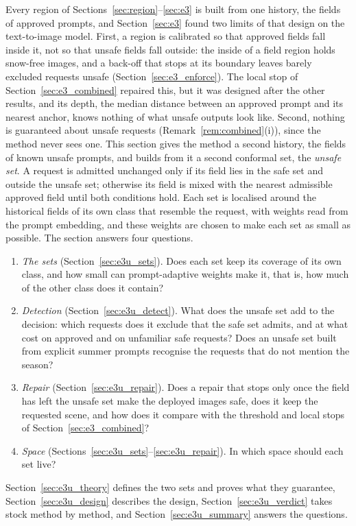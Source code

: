 \documentclass{article}
\theoremstyle{plain}
\theoremstyle{remark}
\begin{document}
Every region of Sections~\ref{sec:region}--\ref{sec:e3} is built from one history, the fields of approved prompts, and
Section~\ref{sec:e3} found two limits of that design on the text-to-image model. First, a region is calibrated so that approved fields
fall inside it, not so that unsafe fields fall outside: the inside of a field region holds snow-free images, and a back-off that stops
at its boundary leaves barely excluded requests unsafe (Section~\ref{sec:e3_enforce}). The local stop of Section~\ref{sec:e3_combined}
repaired this, but it was designed after the other results, and its depth, the median distance between an approved prompt and its
nearest anchor, knows nothing of what unsafe outputs look like. Second, nothing is guaranteed about unsafe requests
(Remark~\ref{rem:combined}(i)), since the method never sees one. This section gives the method a second history, the fields of known
unsafe prompts, and builds from it a second conformal set, the \emph{unsafe set}. A request is admitted unchanged only if its field
lies in the safe set and outside the unsafe set; otherwise its field is mixed with the nearest admissible approved field until both
conditions hold. Each set is localised around the historical fields of its own class that resemble the request, with weights read
from the prompt embedding, and these weights are chosen to make each set as small as possible. The section answers four questions.
\begin{enumerate}[label=(Q\arabic*)]
\item \emph{The sets} (Section~\ref{sec:e3u_sets}). Does each set keep its coverage of its own class, and how small can prompt-adaptive
weights make it, that is, how much of the other class does it contain?
\item \emph{Detection} (Section~\ref{sec:e3u_detect}). What does the unsafe set add to the decision: which requests does it exclude that
the safe set admits, and at what cost on approved and on unfamiliar safe requests? Does an unsafe set built from explicit summer
prompts recognise the requests that do not mention the season?
\item \emph{Repair} (Section~\ref{sec:e3u_repair}). Does a repair that stops only once the field has left the unsafe set make the deployed
images safe, does it keep the requested scene, and how does it compare with the threshold and local stops of
Section~\ref{sec:e3_combined}?
\item \emph{Space} (Sections~\ref{sec:e3u_sets}--\ref{sec:e3u_repair}). In which space should each set live?
\end{enumerate}
Section~\ref{sec:e3u_theory} defines the two sets and proves what they guarantee, Section~\ref{sec:e3u_design} describes the design,
Section~\ref{sec:e3u_verdict} takes stock method by method, and Section~\ref{sec:e3u_summary} answers the questions.
\end{document}
